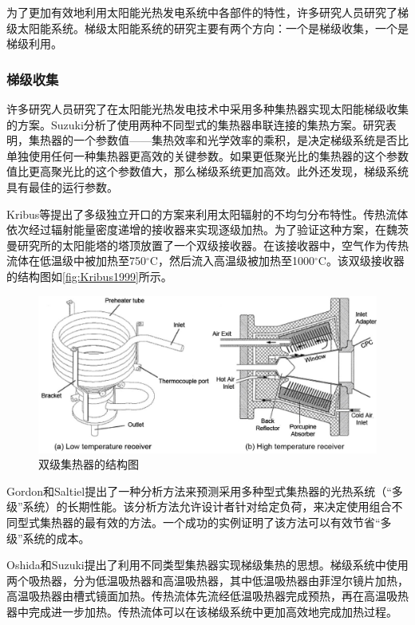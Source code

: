 为了更加有效地利用太阳能光热发电系统中各部件的特性，许多研究人员研究了梯级太阳能系统。梯级太阳能系统的研究主要有两个方向：一个是梯级收集，一个是梯级利用。

\subsubsection{梯级收集}

许多研究人员研究了在太阳能光热发电技术中采用多种集热器实现太阳能梯级收集的方案。Suzuki\cite{Suzuki1986}分析了使用两种不同型式的集热器串联连接的集热方案。研究表明，集热器的一个参数值——集热效率和光学效率的乘积，是决定梯级系统是否比单独使用任何一种集热器更高效的关键参数。如果更低聚光比的集热器的这个参数值比更高聚光比的这个参数值大，那么梯级系统更加高效。此外还发现，梯级系统具有最佳的运行参数。

Kribus等\cite{Kribus1999}提出了多级独立开口的方案来利用太阳辐射的不均匀分布特性。传热流体依次经过辐射能量密度递增的接收器来实现逐级加热。为了验证这种方案，在魏茨曼研究所的太阳能塔的塔顶放置了一个双级接收器。在该接收器中，空气作为传热流体在低温级中被加热至750$\mathrm{^\circ C}$，然后流入高温级被加热至1000$\mathrm{^\circ C}$。该双级接收器的结构图如\autoref{fig:Kribus1999}所示。

\begin{figure}[!ht]
\centering
\includegraphics[width=.8\textwidth]{fig/Kribus1999.jpg}
\caption{双级集热器的结构图}
\label{fig:Kribus1999}
\end{figure}

Gordon和Saltiel提出了一种分析方法来预测采用多种型式集热器的光热系统（“多级”系统）的长期性能。该分析方法允许设计者针对给定负荷，来决定使用组合不同型式集热器的最有效的方法。一个成功的实例证明了该方法可以有效节省“多级”系统的成本。

Oshida和Suzuki\cite{Oshida1987}提出了利用不同类型集热器实现梯级集热的思想。梯级系统中使用两个吸热器，分为低温吸热器和高温吸热器，其中低温吸热器由菲涅尔镜片加热，高温吸热器由槽式镜面加热。传热流体先流经低温吸热器完成预热，再在高温吸热器中完成进一步加热。传热流体可以在该梯级系统中更加高效地完成加热过程。


